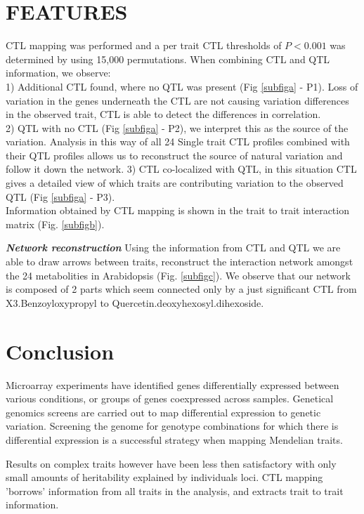 \documentclass{bioinfo}
\begin{document}
\section{FEATURES}
  CTL mapping was performed and a per trait CTL thresholds of $P < 0.001$ was 
  determined by using 15,000 permutations.
  When combining CTL and QTL information, we observe:\\
  1) Additional CTL found, where no QTL was present (Fig \ref{subfiga} - P1). Loss of variation in the genes 
  underneath the CTL are not causing variation differences in the observed trait, CTL is able to 
  detect the differences in correlation.\\
  2) QTL with no CTL (Fig \ref{subfiga} - P2), we interpret this as the source of the variation. Analysis in this way of 
  all 24 Single trait CTL profiles combined with their QTL profiles allows us to reconstruct the 
  source of natural variation and follow it down the network.
  3) CTL co-localized with QTL, in this situation CTL gives a detailed view of which traits 
  are contributing variation to the observed QTL  (Fig \ref{subfiga} - P3).\\
  
  Information obtained by CTL mapping is shown in the trait to trait interaction matrix (Fig. \ref{subfigb}).

\emph{ {\bf Network reconstruction}}
  Using the information from CTL and QTL we are able to draw arrows between traits, reconstruct the interaction 
  network amongst the 24 metabolities in Arabidopsis (Fig. \ref{subfigc}). We observe that our network is 
  composed of 2 parts which seem connected only by a just significant CTL from X3.Benzoyloxypropyl to 
  Quercetin.deoxyhexosyl.dihexoside.

\section{Conclusion}
  Microarray experiments have identified genes differentially expressed between various 
  conditions, or groups of genes coexpressed across samples. Genetical genomics screens 
  are carried out to map differential expression to genetic variation. Screening 
  the genome for genotype combinations for which there is differential expression is 
  a successful strategy when mapping Mendelian traits. 
  
  Results on complex traits however have been less then satisfactory with only small 
  amounts of heritability explained by individuals loci. CTL mapping 'borrows'
  information from all traits in the analysis, and extracts trait to trait 
   information.
 
\end{document}
